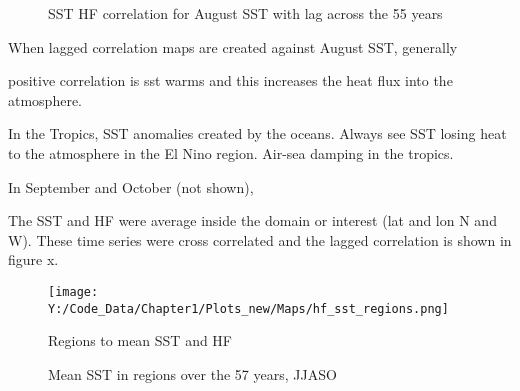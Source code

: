 \begin{figure}
	\centering
	
	\caption{SST HF correlation for August SST with lag across the 55 years} \label{fig:corr_sstAug_hflag} 
\end{figure} 

When lagged correlation maps are created against August SST, generally 

positive correlation is sst warms and this increases the heat flux into the atmosphere.

In the Tropics, SST anomalies created by the oceans. Always see SST losing heat to the atmosphere in the El Nino region. Air-sea damping in the tropics.

In September and October (not shown), 


The SST and HF were average inside the domain or interest (lat and lon N and W). These time series were cross correlated and the lagged correlation is shown in figure x.

\begin{figure}[h]
	\centering
	\noindent\texttt{[image: Y:/Code\_Data/Chapter1/Plots\_new/Maps/hf\_sst\_regions.png]}
	\caption{Regions to mean SST and HF}\label{fig:regions_ssthf}
\end{figure}


\begin{figure} %
	

			
	\caption{Mean SST in regions over the 57 years, JJASO}\label{fig:region_sst}
\end{figure}

